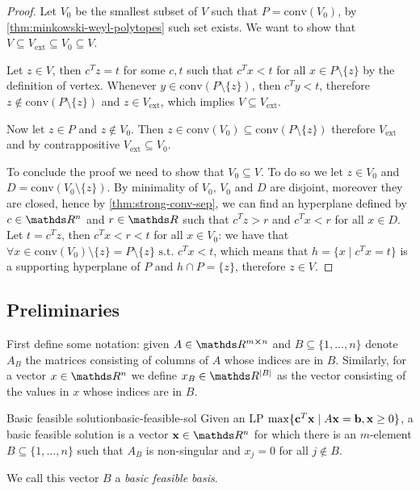 \documentclass[12pt]{extarticle}
\renewcommand{\vec}[1]{\bvec{#1}}
\begin{document}
\begin{proof}
	Let $V_0$ be the smallest subset of $V$ such that $P = \mathrm{conv}(V_0)$,
	by \cref{thm:minkowski-weyl-polytopes} such set exists.
	We want to show that $V \subseteq V_\text{ext} \subseteq V_0 \subseteq V$.

	Let $z \in V$, then $c^T z = t$ for some $c, t$ such that $c^T x < t$
	for all $x \in P \setminus \{z\}$ by the definition of vertex.
	Whenever $y \in \mathrm{conv}(P\setminus \{z\})$, then $c^T y < t$, therefore
	$z \notin \mathrm{conv}(P\setminus \{z\})$ and $z \in V_\text{ext}$,
	which implies $V \subseteq V_\text{ext}$.

	Now let $z \in P$ and $z \notin V_0$.
	Then $z \in \mathrm{conv}(V_0) \subseteq \mathrm{conv}(P \setminus \{z\})$
	therefore $V_\text{ext}$ and by contrappositive $V_\text{ext} \subseteq V_0$.

	To conclude the proof we need to show that $V_0 \subseteq V$. To do so we let $z \in V_0$
	and $D = \mathrm{conv}(V_0 \setminus \{z\})$. By minimality of $V_0$, $V_0$ and $D$ are disjoint,
	moreover they are closed, hence by \cref{thm:strong-conv-sep}, we can find an hyperplane defined
	by $c \in \R^n$ and $r \in \R$ such that $c^T z > r$ and $c^T x < r$ for all $x \in D$.
	Let $t = c^T z$, then $c^T x < r < t$ for all $x \in V_0$:
	we have that $\forall x \in \mathrm{conv}(V_0) \setminus \{z\} =
		P \setminus \{z\} \text{ s.t. } c^T x < t$,	which means that $h = \{ x \mid c^T x = t \}$
	is a supporting hyperplane of $P$ and $h \cap P = \{z\}$, therefore $z \in V$.
\end{proof}

\subsection{Preliminaries}

First define some notation: given $A \in \R^{m \cross n}$ and $B \subseteq \{1, \dots, n\}$ denote
$A_B$ the matrices consisting of columns of $A$ whose indices are in $B$.
Similarly, for a vector $x \in \R^n$ we define $x_B \in \R^\abs{B}$ as the vector consisting
of the values in $x$ whose indices are in $B$.

\begin{definition}{Basic feasible solution}{basic-feasible-sol}
	Given an LP $\max \{ \vec c^T \vec x \mid A \vec x = \vec b, \vec x \geq 0\}$, a basic feasible solution
	is a vector $\vec x \in \R^n$ for which there is an $m$-element $B \subseteq \{1, \dots, n\}$
	such that $A_B$ is non-singular and $x_j = 0$ for all $j \notin B$.

	We call this vector $B$ a \emph{basic feasible basis}.
\end{definition}
\end{document}
